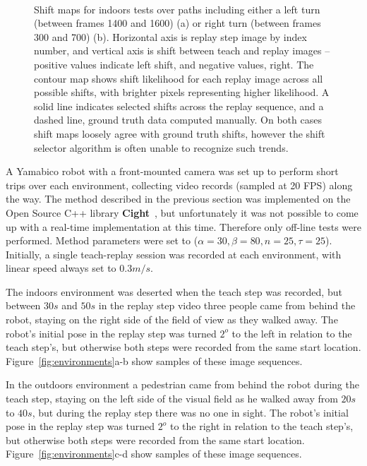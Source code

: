 \documentclass[twocolumn, 9pt,fleqn]{jsproceedings}
\begin{document}
\begin{figure}[t]
\\
\caption{Shift maps for indoors tests over paths including either a left turn (between frames 1400 and 1600) (a) or right turn (between frames 300 and 700) (b). Horizontal axis is replay step image by index number, and vertical axis is shift between teach and replay images -- positive values indicate left shift, and negative values, right. The contour map shows shift likelihood for each replay image across all possible shifts, with brighter pixels representing higher likelihood. A solid line indicates selected shifts across the replay sequence, and a dashed line, ground truth data computed manually. On both cases shift maps loosely agree with ground truth shifts, however the shift selector algorithm is often unable to recognize such trends.}
\label{fig:shift_maps}
\end{figure}

A Yamabico robot with a front-mounted camera was set up to perform short trips over each environment, collecting video records (sampled at 20 FPS) along the way. The method described in the previous section was implemented on the Open Source C++ library \textbf{Cight}~\cite{HEL14c}, but unfortunately it was not possible to come up with a real-time implementation at this time. Therefore only off-line tests were performed. Method parameters were set to ($\alpha = 30, \beta = 80, n = 25, \tau = 25$). Initially, a single teach-replay session was recorded at each environment, with linear speed always set to $0.3m/s$.

The indoors environment was deserted when the teach step was recorded, but between $30s$ and $50s$ in the replay step video three people came from behind the robot, staying on the right side of the field of view as they walked away. The robot's initial pose in the replay step was turned $2^o$ to the left in relation to the teach step's, but otherwise both steps were recorded from the same start location. Figure~\ref{fig:environments}a-b show samples of these image sequences.

In the outdoors environment a pedestrian came from behind the robot during the teach step, staying on the left side of the visual field as he walked away from $20s$ to $40s$, but during the replay step there was no one in sight. The robot's initial pose in the replay step was turned $2^o$ to the right in relation to the teach step's, but otherwise both steps were recorded from the same start location. Figure~\ref{fig:environments}c-d show samples of these image sequences.
\end{document}

